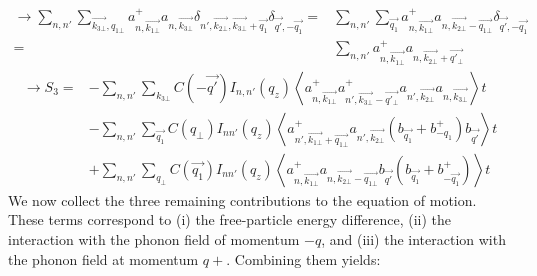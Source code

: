 \documentclass{article}
\begin{document}
\begin{align*}
    \rightarrow \sum_{n,n'} \sum_{\vec{k_{3\bot}},q_{1\bot}} a^+_{n, \vec{k_{1\bot}}} a_{n, \vec{k_{3\bot}}} \delta_{n', \vec{k_{2\bot}}, \vec{k_{3\bot}} + \vec{q_1}}\delta_{\vec{q'}, - \vec{q_1}}= & \sum_{n,n'} \sum_{\vec{q_1}} a^+_{n, \vec{k_{1\bot}}} a_{n, \vec{k_{2\bot}} - \vec{q_{1\bot}}}\delta_{\vec{q'}, - \vec{q_1}}\\
    = & \sum_{n,n'} a^+_{n, \vec{k_{1\bot}}} a_{n, \vec{k_{2\bot}} + \vec{q'_{\bot}}}
\end{align*}
\begin{align*}
    \rightarrow S_3 = & - \sum_{n,n'} \sum_{k_{3\bot}} C \left(- \vec{q'}\right) I _{n,n'} \left(q_z\right) \left \langle a^+_{n, \vec{k_{1\bot}}} a^+_{n', \vec{k_{3\bot}} - \vec{q'_{\bot}}}a_{n', \vec{k_{2\bot}}} a_{n, \vec{k_{3\bot}}}\right \rangle t \\
    & - \sum_{n,n'} \sum_{\vec{q_1}} C \left(q_\bot\right) I_{n n'} \left(q_z \right) \left \langle a^+_{n', \vec{k_{1\bot}} + \vec{q_{1\bot}}}a_{n', \vec{k_{2\bot}}}\left(b_{\vec{q_1}}+ b^+_{- q_1}\right) b_{\vec{q'}}\right \rangle t \\
    & + \sum_{n,n'} \sum_{q_\bot} C \left(\vec{q_1} \right) I_{nn'} \left(q_z\right) \left \langle a^+_{n, \vec{k_{1\bot}}} a_{n, \vec{k_{2\bot}} - \vec{q_{1\bot}}}b_{\vec{q'}} \left(b_{\vec{q_1}}+b^+_{- \vec{q_1}}\right) \right \rangle t
\end{align*}
We now collect the three remaining contributions to the equation of motion. These terms correspond to (i) the free-particle energy difference, (ii) the interaction with the phonon field of momentum $-q$, and (iii) the interaction with the phonon field at momentum $q+$. Combining them yields: 
\end{document}
